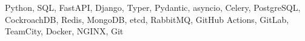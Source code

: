 \hspace{0.2in}Python, SQL, FastAPI, Django, Typer, Pydantic, asyncio, Celery,
PostgreSQL, CockroachDB, Redis, MongoDB, etcd, RabbitMQ,
GitHub Actions, GitLab, TeamCity, Docker, NGINX, Git